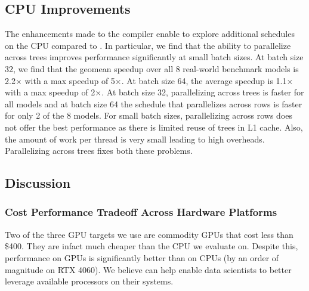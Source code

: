 
\subsection{CPU Improvements}
The enhancements made to the compiler enable \Treebeard{} to explore additional schedules on the CPU
compared to \TreebeardOLD{}. 
In particular, we find that the ability to parallelize across trees improves performance 
significantly at small batch sizes. At batch size 32, we find that the geomean speedup over 
all 8 real-world benchmark models is 2.2$\times$ with a max speedup of 5$\times$. At batch size 64, the average speedup
is 1.1$\times$ with a max speedup of 2$\times$. At batch size 32, parallelizing across trees is faster 
for all models and at batch size 64 the \TreebeardOLD{} schedule that parallelizes across 
rows is faster for only 2 of the 8 models. For small batch sizes, parallelizing across rows does 
not offer the best performance as there is limited reuse of trees in L1 cache.
Also, the amount of work per thread is very small leading to high overheads. 
Parallelizing across trees fixes both these problems. 

\subsection{Discussion}
\subsubsection*{Cost Performance Tradeoff Across Hardware Platforms}
Two of the three GPU targets we use are commodity GPUs that cost less than \$400. They 
are infact much cheaper than the CPU we evaluate on. Despite this, performance on GPUs
is significantly better than on CPUs (by an order of magnitude on RTX 4060).
We believe \Treebeard{} can help enable data scientists to better leverage 
available processors on their systems.

